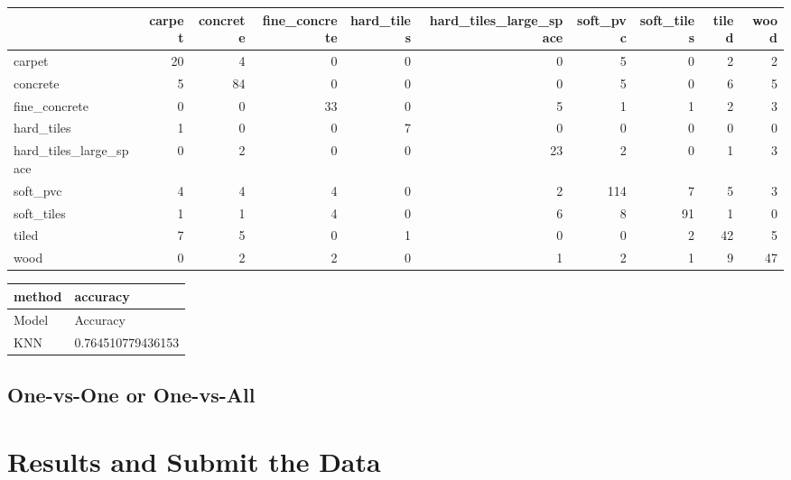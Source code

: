 \documentclass[]{article}
\newenvironment{Shaded}{\begin{snugshade}}{\end{snugshade}}
\newcommand{\DataTypeTok}[1]{\textcolor[rgb]{0.13,0.29,0.53}{#1}}
\newcommand{\KeywordTok}[1]{\textcolor[rgb]{0.13,0.29,0.53}{\textbf{#1}}}
\newcommand{\NormalTok}[1]{#1}
\newcommand{\OperatorTok}[1]{\textcolor[rgb]{0.81,0.36,0.00}{\textbf{#1}}}
\newcommand{\StringTok}[1]{\textcolor[rgb]{0.31,0.60,0.02}{#1}}
\begin{document}
\begin{longtable}[]{@{}lrrrrrrrrr@{}}
\toprule
& carpet & concrete & fine\_concrete & hard\_tiles &
hard\_tiles\_large\_space & soft\_pvc & soft\_tiles & tiled &
wood\tabularnewline
\midrule
\endhead
carpet & 20 & 4 & 0 & 0 & 0 & 5 & 0 & 2 & 2\tabularnewline
concrete & 5 & 84 & 0 & 0 & 0 & 5 & 0 & 6 & 5\tabularnewline
fine\_concrete & 0 & 0 & 33 & 0 & 5 & 1 & 1 & 2 & 3\tabularnewline
hard\_tiles & 1 & 0 & 0 & 7 & 0 & 0 & 0 & 0 & 0\tabularnewline
hard\_tiles\_large\_space & 0 & 2 & 0 & 0 & 23 & 2 & 0 & 1 &
3\tabularnewline
soft\_pvc & 4 & 4 & 4 & 0 & 2 & 114 & 7 & 5 & 3\tabularnewline
soft\_tiles & 1 & 1 & 4 & 0 & 6 & 8 & 91 & 1 & 0\tabularnewline
tiled & 7 & 5 & 0 & 1 & 0 & 0 & 2 & 42 & 5\tabularnewline
wood & 0 & 2 & 2 & 0 & 1 & 2 & 1 & 9 & 47\tabularnewline
\bottomrule
\end{longtable}

\begin{Shaded}
\end{Shaded}

\begin{longtable}[]{@{}ll@{}}
\toprule
method & accuracy\tabularnewline
\midrule
\endhead
Model & Accuracy\tabularnewline
KNN & 0.764510779436153\tabularnewline
\bottomrule
\end{longtable}

\hypertarget{one-vs-one-or-one-vs-all}{%
\subsection{One-vs-One or One-vs-All}\label{one-vs-one-or-one-vs-all}}

\hypertarget{results-and-submit-the-data}{%
\section{Results and Submit the
Data}\label{results-and-submit-the-data}}
\end{document}
